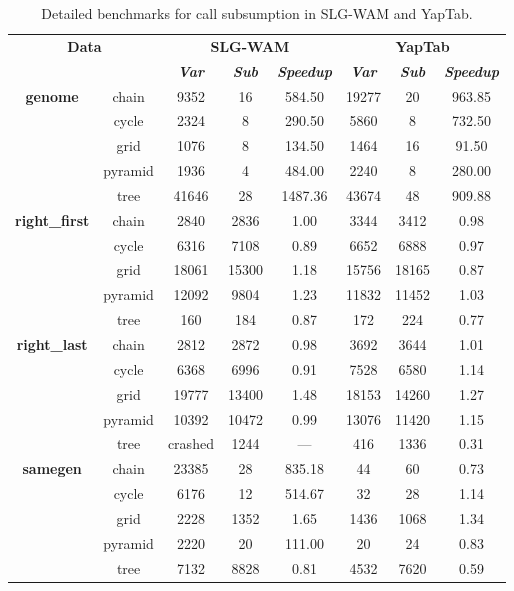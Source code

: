 \begin{table}[ht]
\centering
\footnotesize{
  \begin{tabular}{cc|ccc|ccc}
   \hline
    \hline
    \multicolumn{2}{c|}{\multirow{2}{*}{\small{\textbf{Data}}}} & \multicolumn{3}{c|}{\small{\textbf{SLG-WAM}}} & \multicolumn{3}{c}{\small{\textbf{YapTab}}} \\
     \multicolumn{2}{c|}{} & \textbf{\textit{Var}} & \textbf{\textit{Sub}} & \textbf{\textit{Speedup}} & \textbf{\textit{Var}} & \textbf{\textit{Sub}} & \textbf{\textit{Speedup}} \\
   \hline
   \hline
\multirow{5}{*}{\textbf{genome}} &  \scriptsize{chain}  &  9352 & 16 &  584.50  & 19277 & 20 &  963.85 \\
&  \scriptsize{cycle}  &  2324 & 8 &  290.50  & 5860 & 8 &  732.50 \\
&  \scriptsize{grid}  &  1076 & 8 &  134.50  & 1464 & 16 &  91.50 \\
&  \scriptsize{pyramid}  &  1936 & 4 &  484.00  & 2240 & 8 &  280.00 \\
&  \scriptsize{tree}  &  41646 & 28 &  1487.36  & 43674 & 48 &  909.88 \\
\hline
\multirow{5}{*}{\textbf{right\_first}} &  \scriptsize{chain}  &  2840 & 2836 &  1.00  & 3344 & 3412 &  0.98 \\
&  \scriptsize{cycle}  &  6316 & 7108 &  0.89  & 6652 & 6888 &  0.97 \\
&  \scriptsize{grid}  &  18061 & 15300 &  1.18  & 15756 & 18165 &  0.87 \\
&  \scriptsize{pyramid}  &  12092 & 9804 &  1.23  & 11832 & 11452 &  1.03 \\
&  \scriptsize{tree}  &  160 & 184 &  0.87  & 172 & 224 &  0.77 \\
\hline
\multirow{5}{*}{\textbf{right\_last}} &  \scriptsize{chain}  &  2812 & 2872 &  0.98  & 3692 & 3644 &  1.01 \\
&  \scriptsize{cycle}  &  6368 & 6996 &  0.91  & 7528 & 6580 &  1.14 \\
&  \scriptsize{grid}  &  19777 & 13400 &  1.48  & 18153 & 14260 &  1.27 \\
&  \scriptsize{pyramid}  &  10392 & 10472 &  0.99  & 13076 & 11420 &  1.15 \\
&  \scriptsize{tree}  &  \scriptsize{crashed} & 1244 &  ---  & 416 & 1336 &  0.31 \\
\hline
\multirow{5}{*}{\textbf{samegen}} &  \scriptsize{chain}  &  23385 & 28 &  835.18  & 44 & 60 &  0.73 \\
&  \scriptsize{cycle}  &  6176 & 12 &  514.67  & 32 & 28 &  1.14 \\
&  \scriptsize{grid}  &  2228 & 1352 &  1.65  & 1436 & 1068 &  1.34 \\
&  \scriptsize{pyramid}  &  2220 & 20 &  111.00  & 20 & 24 &  0.83 \\
&  \scriptsize{tree}  &  7132 & 8828 &  0.81  & 4532 & 7620 &  0.59 \\
\hline
\hline
\end{tabular}
}
\caption{Detailed benchmarks for call subsumption in SLG-WAM and YapTab.}
\label{tbl:result_path_detail2}
\end{table}
